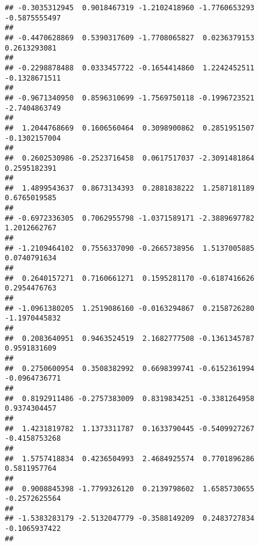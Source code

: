 \documentclass[]{article}
\begin{document}
\begin{verbatim}
## -0.3035312945  0.9018467319 -1.2102418960 -1.7760653293 -0.5875555497 
##                                                                       
## -0.4470628869  0.5390317609 -1.7708065827  0.0236379153  0.2613293081 
##                                                                       
## -0.2298878488  0.0333457722 -0.1654414860  1.2242452511 -0.1328671511 
##                                                                       
## -0.9671340950  0.8596310699 -1.7569750118 -0.1996723521 -2.7404863749 
##                                                                       
##  1.2044768669  0.1606560464  0.3098900862  0.2851951507 -0.1302157004 
##                                                                       
##  0.2602530986 -0.2523716458  0.0617517037 -2.3091481864  0.2595182391 
##                                                                       
##  1.4899543637  0.8673134393  0.2881838222  1.2587181189  0.6765019585 
##                                                                       
## -0.6972336305  0.7062955798 -1.0371589171 -2.3889697782  1.2012662767 
##                                                                       
## -1.2109464102  0.7556337090 -0.2665738956  1.5137005885  0.0740791634 
##                                                                       
##  0.2640157271  0.7160661271  0.1595281170 -0.6187416626  0.2954476763 
##                                                                       
## -1.0961380205  1.2519086160 -0.0163294867  0.2158726280 -1.1970445832 
##                                                                       
##  0.2083640951  0.9463524519  2.1682777508 -0.1361345787  0.9591831609 
##                                                                       
##  0.2750600954  0.3508382992  0.6698399741 -0.6152361994 -0.0964736771 
##                                                                       
##  0.8192911486 -0.2757383009  0.8319834251 -0.3381264958  0.9374304457 
##                                                                       
##  1.4231819782  1.1373311787  0.1633790445 -0.5409927267 -0.4158753268 
##                                                                       
##  1.5757418834  0.4236504993  2.4684925574  0.7701896286  0.5811957764 
##                                                                       
##  0.9008845398 -1.7799326120  0.2139798602  1.6585730655 -0.2572625564 
##                                                                       
## -1.5383283179 -2.5132047779 -0.3588149209  0.2483727834 -0.1065937422 
##                                                                       

\end{verbatim}
\end{document}
